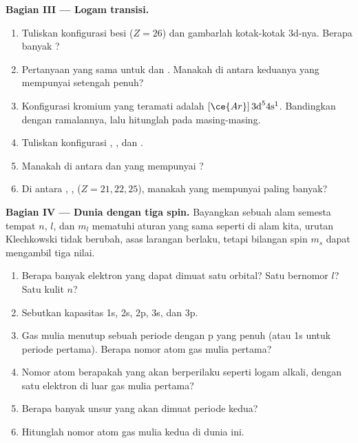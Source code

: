 \begin{problem}
\medskip
\noindent\textbf{Bagian III --- Logam transisi.}
\begin{enumerate}[resume]
  \item Tuliskan konfigurasi besi ($Z = 26$) dan gambarlah kotak-kotak
        3d-nya. Berapa banyak ?
  \item Pertanyaan yang sama untuk  dan . Manakah
        di antara keduanya yang mempunyai  setengah penuh?
  \item Konfigurasi kromium yang teramati adalah $[\ce{Ar}]\,3\text{d}^5
        4\text{s}^1$. Bandingkan dengan ramalannya, lalu hitunglah
         pada masing-masing.
  \item Tuliskan konfigurasi , , dan .
  \item Manakah di antara  dan  yang mempunyai
        ?
  \item Di antara , , 
        ($Z = 21, 22, 25$), manakah yang mempunyai  paling banyak?
\end{enumerate}

\medskip
\noindent\textbf{Bagian IV --- Dunia dengan tiga spin.}
Bayangkan sebuah alam semesta tempat $n$, $l$, dan $m_l$ mematuhi
aturan yang sama seperti di alam kita, urutan Klechkowski tidak berubah,
asas larangan berlaku, tetapi bilangan spin $m_s$ dapat mengambil tiga
nilai.
\begin{enumerate}[resume]
  \item Berapa banyak elektron yang dapat dimuat satu orbital? Satu
         bernomor $l$? Satu kulit $n$?
  \item Sebutkan kapasitas 1s, 2s, 2p, 3s, dan 3p.
  \item Gas mulia menutup sebuah periode dengan  p yang penuh
        (atau 1s untuk periode pertama). Berapa nomor atom gas mulia
        pertama?
  \item Nomor atom berapakah yang akan berperilaku seperti logam alkali,
        dengan satu elektron di luar gas mulia pertama?
  \item Berapa banyak unsur yang akan dimuat periode kedua?
  \item Hitunglah nomor atom gas mulia kedua di dunia ini.
\end{enumerate}
\end{problem}
